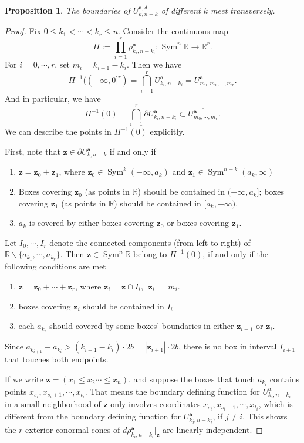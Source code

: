 \documentclass{article}
\def\R{\mathbb{R}}
\def\C{\mathbb{C}}
\def\In{\subset}
\def\d{\partial}
\def\wb{\overline}
\def\RM{\backslash}
\DeclareMathOperator{\Sym}{Sym}
\def\bz{\mathbf{z}} %
\def\ba{\mathbf{a}} %
\newtheorem{proposition}[theorem]{Proposition}
\theoremstyle{definition}
\begin{document}
\begin{proposition} \label{prop: transverse boundaries}
    The boundaries of $U^{\ba, \delta}_{k,n-k}$ of different $k$ meet transversely.
\end{proposition}
\begin{proof}


Fix $0 \leq k_1 <\cdots < k_r \leq n$. Consider the continuous map
$$ \Pi:=\prod_{i=1}^r \rho^{\ba}_{k_i, n-k_i} : \Sym^n \R \to \R^r.$$
For $i=0, \cdots, r$, set $m_i = k_{i+1}-k_i$. Then we have
$$ \Pi^{-1}( (-\infty, 0]^r) = \bigcap_{i=1}^r \overline{U^\ba_{k_i, n-k_i} }= \wb{U^{\ba}_{m_0, m_1, \cdots, m_r}}.$$
And in particular, we have
$$ \Pi^{-1}(0) = \bigcap_{i=1}^r \d U^\ba_{k_i, n-k_i} \In \overline{U^{\ba}_{m_0, \cdots, m_r}}. $$
We can describe the points in $\Pi^{-1}(0)$ explicitly. 

First, note that $\bz \in \d U^\ba_{k, n-k}$ if and only if
\begin{enumerate}
    \item $\bz = \bz_0 + \bz_1$, where $\bz_0 \in \Sym^k (-\infty, a_k)$ and $\bz_1 \in \Sym^{n-k}(a_k, \infty)$
    \item  Boxes covering $\bz_0$ (as points in $\R$) should be contained in $(-\infty, a_k]$;  boxes covering $\bz_1$ (as points in $\R$) should be contained in $[a_k, +\infty)$. 
    \item $a_k$ is covered by either boxes covering $\bz_0$ or boxes covering $\bz_1$. 
\end{enumerate}

Let $I_0, \cdots, I_r$ denote the connected components (from left to right) of $\R \RM \{a_{k_1}, \cdots, a_{k_r}\}$. Then $\bz \in \Sym^n \R$ belong to $\Pi^{-1}(0)$, if and only if the following conditions are met
\begin{enumerate}
    \item $\bz = \bz_0 + \cdots + \bz_r$, where $\bz_i = \bz \cap I_i$, $|\bz_i|=m_i$. 
    \item boxes covering $\bz_i$ should be contained in $\overline{I_i}$
    \item each $a_{k_i}$ should covered by some boxes' boundaries in either $\bz_{i-1}$ or $\bz_i$. 
\end{enumerate}

Since $a_{k_{i+1}} - a_{k_i} > (k_{i+1} - k_i) \cdot 2b = |\bz_{i+1}| \cdot 2b$, there is no box in interval $I_{i+1}$ that touches both endpoints. 

If we write $\bz = (x_1 \leq x_2 \cdots \leq x_n)$, and suppose the boxes that touch $a_{k_i}$ contains points $x_{s_i}, x_{s_i+1}, \cdots, x_{t_i}$. That means the boundary defining function for $U^\ba_{k_i, n-k_i}$ in a small neighborhood of $\bz$ only involves coordinates $x_{s_i}, x_{s_i+1}, \cdots, x_{t_i}$, which is different from the boundary defining function for $U^\ba_{k_j, n-k_j}$, if $j \neq i$. This shows the $r$ exterior conormal cones of $d\rho^{\ba}_{k_i, n-k_i}|_\bz$ are linearly independent. 


\end{proof}
\end{document}
